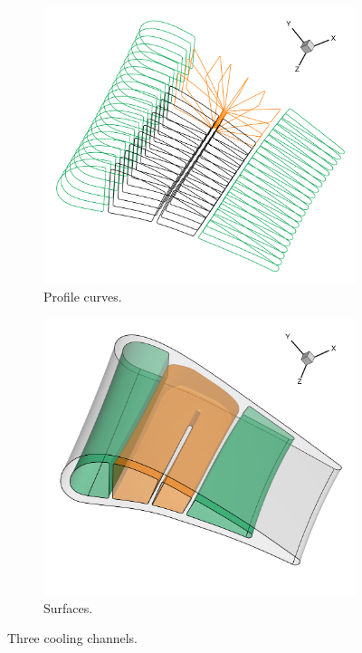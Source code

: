 \documentclass[a4paper, 11pt]{report}
\theoremstyle{definition}
\begin{document}
	\begin{figure}[H]
		\centering
		\begin{subfigure}{.49\textwidth}
			\includegraphics[width=\textwidth]{../tec/channel/13.png}
			\caption{Profile curves.}
		\end{subfigure}
		\begin{subfigure}{.49\textwidth}
			\includegraphics[width=\textwidth]{../tec/channel/14.png}
			\caption{Surfaces.}
		\end{subfigure}
		\caption{Three cooling channels.}
	\end{figure}
\end{document}
